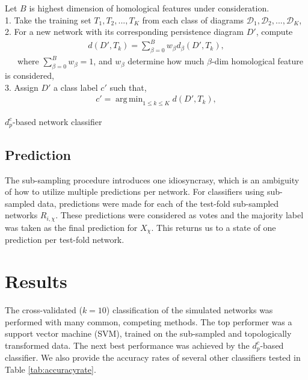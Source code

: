 \documentclass[10pt]{article}
\newcommand{\D}{{\mathcal{D}}}
\DeclareMathOperator*{\argminA}{arg\,min} %
\begin{document}
\begin{algorithm}[!htbp]
	Let $B$ is highest dimension of homological features under consideration.\\ 1. Take the training set $T_1, T_2,..., T_K$ from each class of diagrams $\D_1,\D_2,...,\D_K$, \\
	2. For a new network with its corresponding persistence diagram $D'$, compute
	\begin{align}
	    d(D',T_k)=\sum^B_{\beta=0} w_\beta d_\beta (D',T_k),
	\end{align}
	\ \ \  where $\sum^B_{\beta=0}w_\beta=1$, and $w_\beta$ determine how much $\beta$-dim homological feature is considered,\\
	3. Assign $D'$ a class label $c'$ such that,
	\begin{align}
	    c'=\argminA_{1\leq k \leq K} d(D',T_k),
	\end{align}
	\caption{$d^c_p$-based network classifier}
	\label{alg:dpcclassifier}
\end{algorithm}


\subsection{Prediction}
The sub-sampling procedure introduces one idiosyncrasy, which is an ambiguity of how to utilize multiple predictions per network. For classifiers using sub-sampled data, predictions were made for each of the test-fold sub-sampled networks $R_{i,\chi}$. These predictions were considered as votes and the majority label was taken as the final prediction for $X_{\chi}$. This returns us to a state of one prediction per test-fold network.

\section{Results}\label{sec:results}
The cross-validated ($k=10$) classification of the simulated networks was performed with many common, competing methods. The top performer was a support vector machine (SVM), trained on the sub-sampled and topologically transformed data. The next best performance was achieved by the $d^c_p$-based classifier. We also provide the accuracy rates of several other classifiers tested in Table \ref{tab:accuracyrate}.
\end{document}
